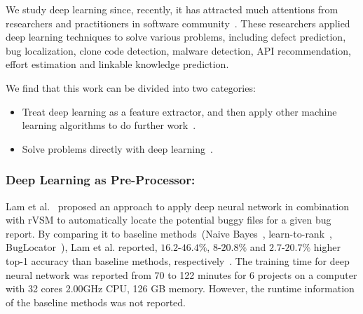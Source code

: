 \documentclass[sigconf]{acmart}
\theoremstyle{break}
\newcommand{\bi}{\begin{itemize}[leftmargin=0.4cm]}
\newcommand{\ei}{\end{itemize}}
\begin{document}
We study deep learning since, recently, it  has attracted 
much attentions from researchers and practitioners in software
 community~\cite{wang2016automatically, gu2016deep, xu2016predicting,white2016deep,white2015toward,lam2015combining,choetkiertikul2016deep,yuan2014droid,mou2016convolutional}.
 These researchers applied  deep learning techniques to solve various problems,
 including defect prediction, bug localization, clone code detection, malware detection, API recommendation, 
 effort estimation and linkable knowledge prediction.
 
We find that this work   can be divided into   two categories:
 
\bi
\item Treat deep learning as a feature extractor, and then apply other  machine learning algorithms to do further work~\cite{lam2015combining,wang2016automatically,choetkiertikul2016deep}.
\item Solve problems directly with  deep learning~\cite{gu2016deep,xu2016predicting,white2016deep,white2015toward,yuan2014droid,mou2016convolutional}.
\ei
\noindent
\subsubsection{Deep Learning as  Pre-Processor:}

Lam et al.~\cite{lam2015combining}  proposed an approach to apply deep neural network
 in combination with rVSM to automatically locate the potential buggy files for a given
 bug report. By comparing it to baseline methods~(Naive Bayes~\cite{kim2013should}, learn-to-rank~\cite{ye2014learning}, 
 BugLocator~\cite{zhou2012should}), Lam et al. reported, $\mbox{16.2-46.4}\%$, $\mbox{8-20.8}\%$  and $\mbox{2.7-20.7}\%$ 
 higher top-1 accuracy than baseline methods, respectively~\cite{lam2015combining}. The training time for deep neural
 network was reported from 70 to 122 minutes for 6 projects on a computer with 32 cores 2.00GHz CPU,
 126 GB memory. However,
 the runtime information of the baseline methods was not reported.
 
\end{document}
